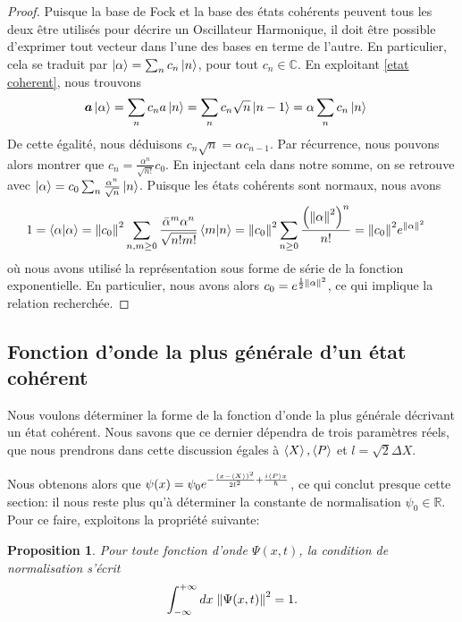 \documentclass[11pt,oneside,a4paper]{article}
\newtheorem{property}[theorem]{Proposition}
\begin{document}
\begin{proof}
  Puisque la base de Fock et la base des états cohérents peuvent tous les deux être utilisés pour décrire un Oscillateur Harmonique, il doit être possible d'exprimer tout vecteur dans l'une des bases en terme de l'autre. En particulier, cela se traduit par $\ket{\alpha} = \sum_n c_n \ket{n}$, pour tout $c_n\in\mathbb{C}$. En exploitant \eqref{etat coherent}, nous trouvons
  \begin{align}
    \bm{a}\ket{\alpha} = \sum_n c_n a\ket{n} = \sum_n c_n\sqrt{n}\ket{n-1} &= \alpha\sum_n c_n \ket{n}
  \end{align}
  De cette égalité, nous déduisons $c_n\sqrt{n}=\alpha c_{n-1}$. Par récurrence, nous pouvons alors montrer que $c_n = \frac{\alpha^n}{\sqrt{n!}}c_0$. En injectant cela dans notre somme, on se retrouve avec $\ket{\alpha} = c_0\sum_n \frac{\alpha^n}{\sqrt{n}}\ket{n}$. Puisque les états cohérents sont normaux, nous avons
  \begin{align}
    1 = \braket{\alpha} &= \norm{c_0}^2 \sum_{n,m\geq 0} \frac{\bar{\alpha}^m\alpha^n}{\sqrt{n!m!}}\braket{m}{n} = \norm{c_0}^2\sum_{n\geq 0} \frac{\left(\norm{\alpha}^2\right)^n}{n!} = \norm{c_0}^2e^{\norm{\alpha}^2}
  \end{align}
  où nous avons utilisé la représentation sous forme de série de la fonction exponentielle. En particulier, nous avons alors $c_0 = e^{\frac{1}{2}\norm{\alpha}^2}$, ce qui implique la relation recherchée.
\end{proof}

\subsection{Fonction d'onde la plus générale d'un état cohérent}
Nous voulons déterminer la forme de la fonction d'onde la plus générale décrivant un état cohérent. Nous savons que ce dernier dépendra de trois paramètres réels, que nous prendrons dans cette discussion égales à $\expval{X},\expval{P}$ et $l = \sqrt{2}\Delta X$.

Nous obtenons alors que $\psi(x) = \psi_0e^{-\frac{\left(x-\expval{X}\right)^2}{2l^2}+\frac{i\expval{P}x}{\hbar}}$, ce qui conclut presque cette section: il nous reste plus qu'à déterminer la constante de normalisation $\psi_0\in\mathbb{R}$. Pour ce faire, exploitons la propriété suivante:

\begin{property}
    Pour toute fonction d'onde $\Psi(x,t)$, la condition de normalisation s'écrit 
    \begin{equation}
        \int_{-\infty}^{+\infty}dx \; \norm{\Psi(x,t)}^2= 1.
    \end{equation}
\end{property}
\end{document}
